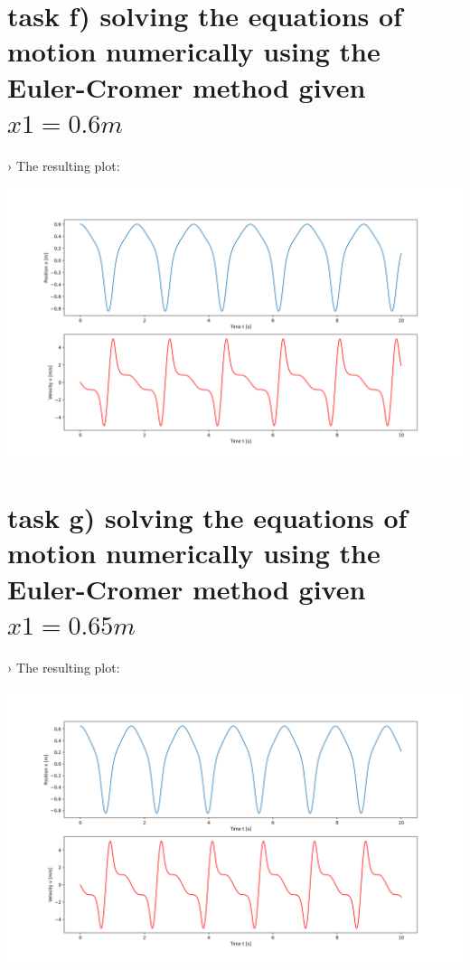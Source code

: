 \documentclass{article}
\begin{document}
    \section*{task f) solving the equations of motion numerically using the Euler-Cromer method given \(x1 = 0.6m \)}
    
    \pagebreak
    › The resulting plot:
    \begin{center}
        \includegraphics[scale=0.45]{../block.png}\linebreak
    \end{center}

    \section*{task g) solving the equations of motion numerically using the Euler-Cromer method given \(x1 = 0.65m \)}
    
    \pagebreak
    › The resulting plot:
    \begin{center}
        \includegraphics[scale=0.45]{../block2.png}\linebreak
    \end{center}
\end{document}
